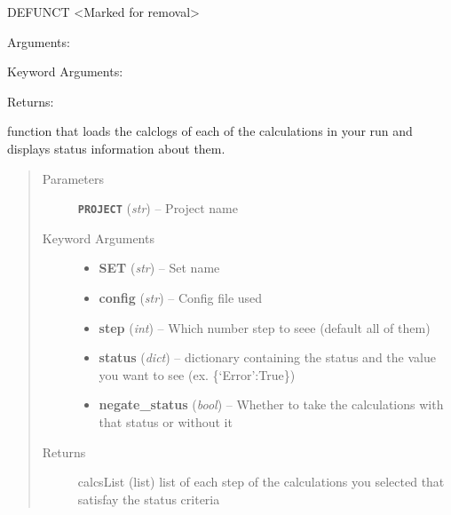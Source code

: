 \documentclass[letterpaper,10pt,english]{sphinxmanual}
\begin{document}
\begin{fulllineitems}
\label{retr:retr.celldm2params}
DEFUNCT \textless{}Marked for removal\textgreater{}

Arguments:

Keyword Arguments:

Returns:

\end{fulllineitems}


\begin{fulllineitems}
\label{retr:retr.checkStatus}
function that loads the calclogs of each of the calculations in your run and
displays status information about them.
\begin{quote}\begin{description}
\item[{Parameters}] \leavevmode
\textbf{\texttt{PROJECT}} (\emph{str}) -- Project name

\item[{Keyword Arguments}] \leavevmode\begin{itemize}
\item {} 
\textbf{SET} (\emph{str}) --
Set name

\item {} 
\textbf{config} (\emph{str}) --
Config file used

\item {} 
\textbf{step} (\emph{int}) --
Which number step to seee (default all of them)

\item {} 
\textbf{status} (\emph{dict}) --
dictionary containing the status and the value
you want to see (ex. \{`Error':True\})

\item {} 
\textbf{negate\_status} (\emph{bool}) --
Whether to take the calculations with that status or without it

\end{itemize}

\item[{Returns}] \leavevmode
calcsList (list) list of each step of the calculations you
selected that satisfay the status criteria

\end{description}\end{quote}

\end{fulllineitems}
\end{document}
